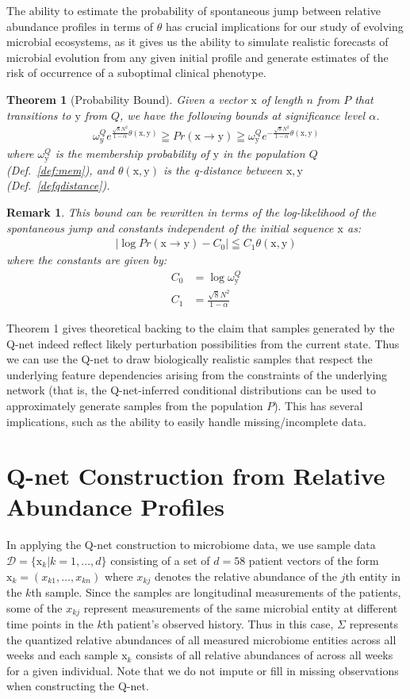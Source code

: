 \documentclass[onecolumn,10pt]{IEEEtran}
\def\EQSP{3pt}
\newcommand{\cgather}[2][\EQSP]{\begingroup\setlength\abovedisplayskip{#1}\setlength\belowdisplayskip{#1}\begin{gather} #2 \end{gather}\endgroup\noindent}
\newcommand{\calign}[2][\EQSP]{\begingroup\setlength\abovedisplayskip{#1}\setlength\belowdisplayskip{#1}\begin{align} #2 \end{align}\endgroup\noindent}
\newtheorem{thm}{Theorem}
\newtheorem{rem}{Remark}
\def\M{\omega}
\newcommand{\mem}[1]{\M_{#1}}
\def\x{\bm{\mathrm{x}}}
\def\y{\bm{\mathrm{y}}}
\def\M{\omega}
\def\qnet{Q-net\xspace}
\def\x{\bm{\mathrm{x}}}
\def\y{\bm{\mathrm{y}}}
\begin{document}
The ability to estimate the probability of spontaneous jump between relative abundance profiles in terms of $\theta$ has crucial implications for our study of evolving microbial ecosystems, as it gives us the ability to simulate realistic forecasts of microbial evolution from any given initial profile and generate estimates of the risk of occurrence of a suboptimal clinical phenotype.

\begin{thm}[Probability Bound]\label{thm:probbnd}
Given a vector $\x$ of length $n$ from $P$ that transitions to $\y$ from $Q$, we have the following bounds at significance level $\alpha$.
\cgather{
\mem{y}^Q e^{ \frac{\sqrt{8}N^2}{1-\alpha}\theta(\x,\y)} \geqq Pr(\x \rightarrow \y) \geqq \mem{\y}^Q e^{-\frac{\sqrt{8}N^2}{1-\alpha}\theta(\x,\y)}
  }%
  where $\mem{\y}^Q$ is the membership probability of  $\y$ in the  population $Q$ (Def.~\ref{def:mem}), and $\theta(\x,\y)$ is the q-distance between $\x,\y$ (Def.~\ref{defqdistance}).
\end{thm}

\begin{rem}
This bound can be rewritten in terms of the log-likelihood of the spontaneous jump and  constants independent of the  initial sequence $\x$ as:
\cgather{
\left \lvert \log Pr(\x \rightarrow \y) -C_0 \right \vert \leqq C_1 \theta(\x,\y)
}%
where the constants are given by:
\calign{
C_0 &= \log \mem{\y}^Q \\
C_1 &= \frac{\sqrt{8} N^2}{1-\alpha}
}%
\end{rem}

Theorem 1 gives theoretical backing to the claim that samples generated by the \qnet indeed reflect likely perturbation possibilities from the current state.  Thus we can use the \qnet to draw biologically realistic samples that respect the underlying feature dependencies arising from the constraints of the underlying network (that is, the \qnet-inferred conditional distributions can be used to approximately generate samples from the population $P$).  This has several implications, such as the ability to easily handle missing/incomplete data. 

\section{\qnet Construction from Relative Abundance Profiles}
\label{sec:qnet_constr}

In applying the \qnet construction to microbiome data,  we use sample data $\mathcal{D} = \{\x_k | k =1,\ldots,d\}$ consisting of a set of $d=58$ patient vectors of the form $\x_k = (x_{k1}, \ldots, x_{kn})$ where $x_{kj}$ denotes the relative abundance of the $j$th entity in the $k$th sample.  Since the samples are longitudinal measurements of the patients, some of the $x_{kj}$ represent measurements of the same microbial entity at different time points in the $k$th patient's observed history.  Thus in this case, $\Sigma$ represents the quantized relative abundances of all measured microbiome entities across all weeks and each sample $\x_k$ consists of all relative abundances of across all weeks for a given individual. Note that we do not impute or fill in missing observations when constructing the \qnet. 
\end{document}
